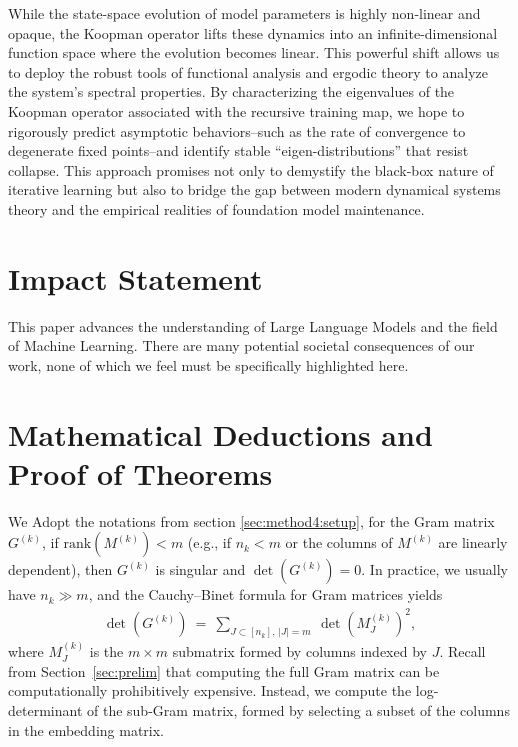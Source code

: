\documentclass{article}
\theoremstyle{plain}
\theoremstyle{definition}
\theoremstyle{remark}
\begin{document}
While the state-space evolution of model parameters is highly non-linear and opaque, the Koopman operator lifts these dynamics into an infinite-dimensional function space where the evolution becomes linear. This powerful shift allows us to deploy the robust tools of functional analysis and ergodic theory to analyze the system's spectral properties. By characterizing the eigenvalues of the Koopman operator associated with the recursive training map, we hope to rigorously predict asymptotic behaviors--such as the rate of convergence to degenerate fixed points--and identify stable ``eigen-distributions'' that resist collapse. This approach promises not only to demystify the black-box nature of iterative learning but also to bridge the gap between modern dynamical systems theory and the empirical realities of foundation model maintenance.



\section*{Impact Statement}

This paper advances the understanding of Large Language Models and the field of Machine Learning. There are many potential societal consequences
of our work, none of which we feel must be specifically
highlighted here.







\clearpage
\appendix
\onecolumn
\section{Mathematical Deductions and Proof of Theorems} \label{app:math}
We Adopt the notations from section \ref{sec:method4:setup}, for the Gram matrix $G^{(k)}$, if $\mathrm{rank}(M^{(k)}) < m$ (e.g., if $n_k < m$ or the columns of $M^{(k)}$ are linearly dependent), then $G^{(k)}$ is singular and $\det(G^{(k)})=0$. In practice, we usually have $n_k \gg m$, and the Cauchy–Binet formula for Gram matrices yields
\begin{align} \label{eq:CB}
    \det(G^{(k)})\ =\ \sum_{J\subset[n_k],\,|J|=m}\ \det(M^{(k)}_J)^2, 
\end{align}
where $M^{(k)}_J$ is the $m\times m$ submatrix formed by columns indexed by $J$. Recall from Section~\ref{sec:prelim} that computing the full Gram matrix can be computationally prohibitively expensive. Instead, we compute the log-determinant of the sub-Gram matrix, formed by selecting a subset of the columns in the embedding matrix.
\end{document}
